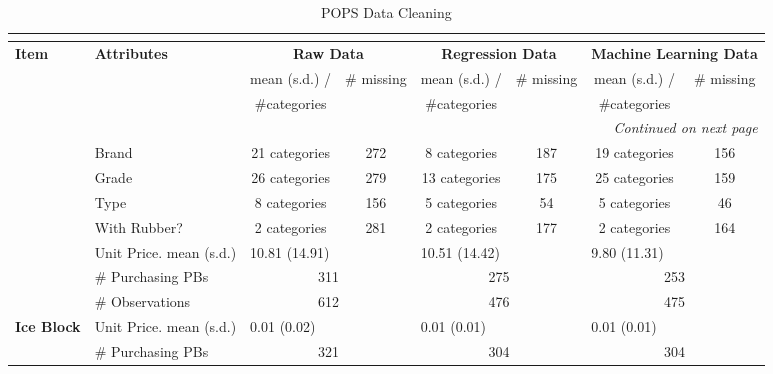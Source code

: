 \begin{longtable}{llccccccccc}
\caption{POPS Data Cleaning} \\
\label{tab:POPSCleaning} \\
\toprule
\multirow{3}{*}{\textbf{Item}} & \multirow{3}{*}{\textbf{Attributes}} & \multicolumn{3}{c}{\textbf{Raw Data}} & \multicolumn{3}{c}{\textbf{Regression Data}} & \multicolumn{3}{c}{\textbf{Machine Learning Data}} \\ 
 & & \multicolumn{2}{c}{mean (s.d.) / } & \multirow{2}{*}{\# missing} & \multicolumn{2}{c}{mean (s.d.) / } & \multirow{2}{*}{\# missing} & \multicolumn{2}{c}{mean (s.d.) / } & \multirow{2}{*}{\# missing} \\ 
 & & \multicolumn{2}{c}{\#categories} & & \multicolumn{2}{c}{\#categories} & & \multicolumn{2}{c}{\#categories} & \\ 
 \midrule 
 \endhead 
 \multicolumn{11}{r}{\textit{Continued on next page}} \\ 
 \endfoot 
 \bottomrule 
 \endlastfoot
 \multirow{7}{*}{\textbf{Pencil}} & Brand & \multicolumn{2}{c}{21 categories} & 272 & \multicolumn{2}{c}{8 categories} & 187 & \multicolumn{2}{c}{19 categories} & 156 \\* 
 & Grade & \multicolumn{2}{c}{26 categories} & 279 & \multicolumn{2}{c}{13 categories} & 175 & \multicolumn{2}{c}{25 categories} & 159 \\* 
 & Type & \multicolumn{2}{c}{8 categories} & 156 & \multicolumn{2}{c}{5 categories} & 54 & \multicolumn{2}{c}{5 categories} & 46 \\* 
 & With Rubber? & \multicolumn{2}{c}{2 categories} & 281 & \multicolumn{2}{c}{2 categories} & 177 & \multicolumn{2}{c}{2 categories} & 164 \\* 
 \cmidrule{2-11} 
 & Unit Price. mean (s.d.) & \multicolumn{3}{l}{10.81 (14.91)} & \multicolumn{3}{l}{10.51 (14.42)} & \multicolumn{3}{l}{9.80 (11.31)} \\* 
 & \# Purchasing PBs & \multicolumn{3}{c}{311} & \multicolumn{3}{c}{275} & \multicolumn{3}{c}{253} \\* 
 & \# Observations & \multicolumn{3}{c}{612} & \multicolumn{3}{c}{476} & \multicolumn{3}{c}{475} \\* 
 \midrule 
\multirow{3}{*}{\textbf{Ice Block}}
 & Unit Price. mean (s.d.) & \multicolumn{3}{l}{0.01 (0.02)} & \multicolumn{3}{l}{0.01 (0.01)} & \multicolumn{3}{l}{0.01 (0.01)} \\* 
 & \# Purchasing PBs & \multicolumn{3}{c}{321} & \multicolumn{3}{c}{304} & \multicolumn{3}{c}{304} \\* 

\end{longtable}
